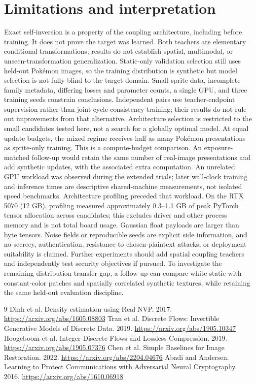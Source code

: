 \documentclass[10pt]{article}
\begin{document}
\section{Limitations and interpretation}
Exact self-inversion is a property of the coupling architecture, including before
training. It does not prove the target was learned. Both teachers are elementary
conditional transformations; results do not establish spatial, multimodal, or
unseen-transformation generalization. Static-only validation selection still uses
held-out Pok\'emon images, so the training distribution is synthetic but model
selection is not fully blind to the target domain. Small sprite data, incomplete
family metadata, differing losses and parameter counts, a single GPU, and three
training seeds constrain conclusions. Independent pairs use teacher-endpoint
supervision rather than joint cycle-consistency training; their results do not
rule out improvements from that alternative. Architecture selection is restricted
to the small candidates tested here, not a search for a globally optimal model.
At equal update budgets, the mixed regime receives half as many Pok\'emon
presentations as sprite-only training. This is a compute-budget comparison.
An exposure-matched follow-up would retain the same number of real-image
presentations and add synthetic updates, with the associated extra computation.
An unrelated GPU workload was observed during the extended trials; later wall-clock
training and inference times are descriptive shared-machine measurements, not
isolated speed benchmarks. Architecture profiling preceded that workload.
On the RTX 5070 (12 GB), profiling measured approximately 0.3--1.1 GB of peak
PyTorch tensor allocation across candidates; this excludes driver and other
process memory and is not total board usage.
Gaussian float payloads are larger than
byte tensors. Noise fields or reproducible seeds are explicit side information,
and no secrecy, authentication, resistance to chosen-plaintext attacks, or
deployment suitability is claimed. Further experiments should add spatial
coupling teachers and independently test security objectives if pursued.
To investigate the remaining distribution-transfer gap, a follow-up can compare
white static with constant-color patches and spatially correlated synthetic
textures, while retaining the same held-out evaluation discipline.

\begin{thebibliography}{9}
 Dinh et al. Density estimation using Real NVP. 2017.
\url{https://arxiv.org/abs/1605.08803}
 Tran et al. Discrete Flows: Invertible Generative Models of
Discrete Data. 2019. \url{https://arxiv.org/abs/1905.10347}
 Hoogeboom et al. Integer Discrete Flows and Lossless Compression.
2019. \url{https://arxiv.org/abs/1905.07376}
 Chen et al. Simple Baselines for Image Restoration. 2022.
\url{https://arxiv.org/abs/2204.04676}
 Abadi and Andersen. Learning to Protect Communications with
Adversarial Neural Cryptography. 2016. \url{https://arxiv.org/abs/1610.06918}
\end{thebibliography}
\end{document}

